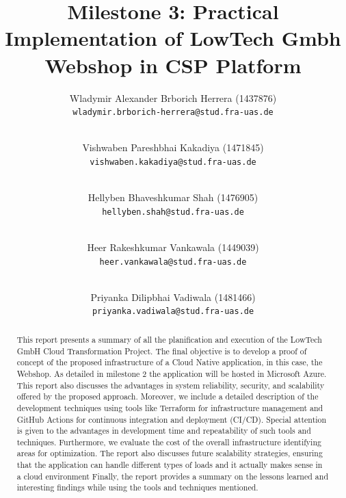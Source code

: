 \documentclass{llncs}
\newcommand{\what}{Milestone 3: Practical Implementation of LowTech Gmbh Webshop in CSP Platform}
\begin{document}
%
%
%
\mainmatter              %
%
\title{\what}
%
\author{
    Wladymir Alexander Brborich Herrera (1437876)\\
    \texttt{wladymir.brborich-herrera@stud.fra-uas.de}
    \and\\
    Vishwaben Pareshbhai Kakadiya (1471845)\\
    \texttt{vishwaben.kakadiya@stud.fra-uas.de}
    \and\\
    Hellyben Bhaveshkumar Shah (1476905)\\
    \texttt{hellyben.shah@stud.fra-uas.de}
    \and\\
    Heer Rakeshkumar Vankawala (1449039)
    \\
    \texttt{heer.vankawala@stud.fra-uas.de}
    \and\\
    Priyanka Dilipbhai Vadiwala (1481466)\\
    \texttt{priyanka.vadiwala@stud.fra-uas.de}
}
%

\maketitle              %

\begin{abstract}
    This report presents a summary of all the planification and execution of the LowTech GmbH Cloud Transformation Project.
    The final objective is to develop a proof of concept of the proposed infrastructure of a Cloud Native application, in this case,
    the Webshop. As detailed in milestone 2 the application will be hosted in Microsoft Azure. This report also discusses the advantages
    in system reliability, security, and scalability offered by the proposed approach.
    Moreover, we include a detailed description of the development techniques using tools like Terraform for infrastructure management and GitHub Actions for
    continuous integration and deployment (CI/CD). Special attention is given to the advantages in development time and repeatability of such tools and techniques.
    Furthermore, we evaluate the cost of the overall infrastructure identifying areas for optimization.
    The report also discusses future scalability strategies, ensuring that the application can handle different types of loads and it actually makes sense in a cloud environment
    Finally, the report provides a summary on the lessons learned and interesting findings while using the tools and techniques mentioned.

\end{abstract}
\end{document}
